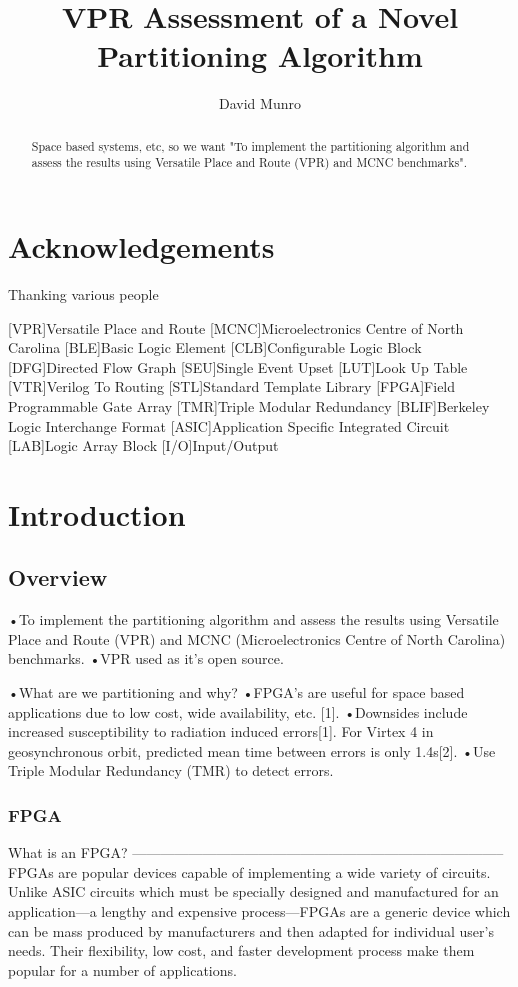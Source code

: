 \documentclass[12pt,drafta4paper,oneside]{memoir} %
\title{VPR Assessment of a Novel Partitioning Algorithm}
\author{David Munro}
\begin{document}
\maketitle
\begin{abstract}
	Space based systems, etc, so we want "To implement the partitioning algorithm and assess the results using Versatile Place and Route (VPR) and MCNC benchmarks".
\end{abstract}
\chapter*{Acknowledgements}
Thanking various people

\newpage
{}[VPR]{Versatile Place and Route}
[MCNC]{Microelectronics Centre of North Carolina}
[BLE]{Basic Logic Element}
[CLB]{Configurable Logic Block}
[DFG]{Directed Flow Graph}
[SEU]{Single Event Upset}
[LUT]{Look Up Table}
[VTR]{Verilog To Routing}
[STL]{Standard Template Library}
[FPGA]{Field Programmable Gate Array}
[TMR]{Triple Modular Redundancy}
[BLIF]{Berkeley Logic Interchange Format}
[ASIC]{Application Specific Integrated Circuit}
[LAB]{Logic Array Block}
[I/O]{Input/Output}
\tableofcontents*
\chapter{Introduction}
\section{Overview}
•To implement the partitioning algorithm and assess the results using Versatile Place and Route (VPR) and MCNC (Microelectronics Centre of North Carolina) benchmarks.
•VPR used as it’s open source.

•What are we partitioning and why?
•FPGA’s are useful for space based applications due to low cost, wide availability, etc. [1].
•Downsides include increased susceptibility to radiation induced errors[1]. For Virtex 4 in geosynchronous orbit, predicted mean time between errors is only 1.4s[2].
•Use Triple Modular Redundancy (TMR) to detect errors.
\subsection{FPGA}
What is an FPGA?
--------------------------------------------------------------------------------
\acp{FPGA} are popular devices capable of implementing a wide variety of circuits. Unlike \ac{ASIC} circuits which must be specially designed and manufactured for an application---a lengthy and expensive process---\acp{FPGA} are a generic device which can be mass produced by manufacturers and then adapted for individual user's needs. Their flexibility, low cost, and faster development process make them popular for a number of applications.
\end{document}
